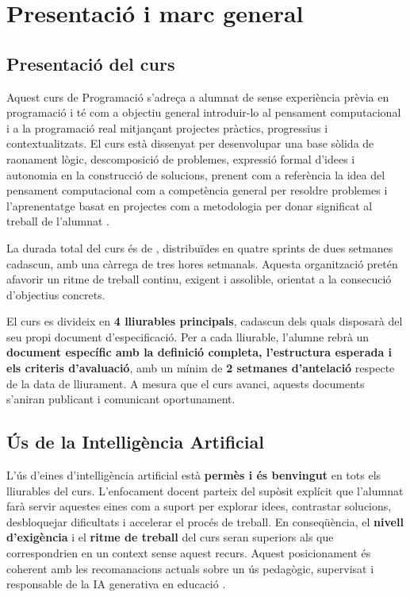 \chapter{Presentaci\'o i marc general}
\label{chap:presentacio}

\section{Presentaci\'o del curs}

Aquest curs de Programaci\'o s'adre\c{c}a a alumnat de \CourseLevel{} sense experi\`encia pr\`evia en programaci\'o i t\'e com a objectiu general introduir-lo al pensament computacional i a la programaci\'o real mitjan\c{c}ant projectes pr\`actics, progressius i contextualitzats. El curs est\`a dissenyat per desenvolupar una base s\`olida de raonament l\`ogic, descomposici\'o de problemes, expressi\'o formal d'idees i autonomia en la construcci\'o de solucions, prenent com a refer\`encia la idea del pensament computacional com a compet\`encia general per resoldre problemes \cite{wing2006} i l'aprenentatge basat en projectes com a metodologia per donar significat al treball de l'alumnat \cite{pblworks2024}.

La durada total del curs \'es de \CourseDuration{}, distribu\"ides en quatre sprints de dues setmanes cadascun, amb una c\`arrega de tres hores setmanals. Aquesta organitzaci\'o pret\'en afavorir un ritme de treball continu, exigent i assolible, orientat a la consecuci\'o d'objectius concrets.

El curs es divideix en \textbf{4 lliurables principals}, cadascun dels quals disposar\`a del seu propi document d'especificaci\'o. Per a cada lliurable, l'alumne rebr\`a un \textbf{document espec\'ific amb la definici\'o completa, l'estructura esperada i els criteris d'avaluaci\'o}, amb un m\'inim de \textbf{2 setmanes d'antelaci\'o} respecte de la data de lliurament. A mesura que el curs avanci, aquests documents s'aniran publicant i comunicant oportunament.

\section{\'Us de la Intel\textperiodcentered lig\`encia Artificial}

L'\'us d'eines d'intel\textperiodcentered lig\`encia artificial est\`a \textbf{perm\`es i \'es benvingut} en tots els lliurables del curs. L'enfocament docent parteix del sup\`osit expl\'icit que l'alumnat far\`a servir aquestes eines com a suport per explorar idees, contrastar solucions, desbloquejar dificultats i accelerar el proc\'es de treball. En conseq\"u\`encia, el \textbf{nivell d'exig\`encia} i el \textbf{ritme de treball} del curs seran superiors als que correspondrien en un context sense aquest recurs. Aquest posicionament \'es coherent amb les recomanacions actuals sobre un \'us pedag\`ogic, supervisat i responsable de la IA generativa en educaci\'o \cite{unesco2023}.

